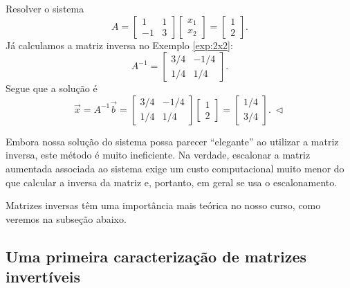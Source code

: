\documentclass[../livro.tex]{subfiles}  %
\begin{document}
\begin{example}
	Resolver o sistema
	\begin{equation}
	A = \left[
	\begin{array}{cc}
	1 & 1  \\
	-1 & 3 
	\end{array}
	\right] \left[
	\begin{array}{c}
	x_1  \\
	x_2 
	\end{array}
	\right] =
	\left[
	\begin{array}{c}
	1  \\
	2 
	\end{array}
	\right].
	\end{equation} Já calculamos a matriz inversa no Exemplo \ref{exp:2x2}:
	\begin{equation}
	A^{-1}  =
	\left[
	\begin{array}{cc}
	3/4 & -1/4  \\
	1/4 & 1/4 
	\end{array}
	\right].
	\end{equation} Segue que a solução é
	\begin{equation}
	\vec{x} = A^{-1} \vec{b} =
	\left[
	\begin{array}{cc}
	3/4 & -1/4  \\
	1/4 & 1/4 
	\end{array}
	\right]\left[
	\begin{array}{c}
	1  \\
	2 
	\end{array}
	\right] =
	\left[
	\begin{array}{c}
	1/4 \\
	3/4 
	\end{array}
	\right]. \ \lhd
	\end{equation}
\end{example}


Embora nossa solução do sistema possa parecer ``elegante'' ao utilizar a matriz inversa, este método é muito ineficiente. Na verdade, escalonar a matriz aumentada associada ao sistema exige um custo computacional muito menor do que calcular a inversa da matriz e, portanto, em geral se usa o escalonamento.

Matrizes inversas têm uma importância mais teórica no nosso curso, como veremos na subseção abaixo.



\subsection{Uma primeira caracterização de matrizes invertíveis}\label{sec:inversa}
\end{document}
